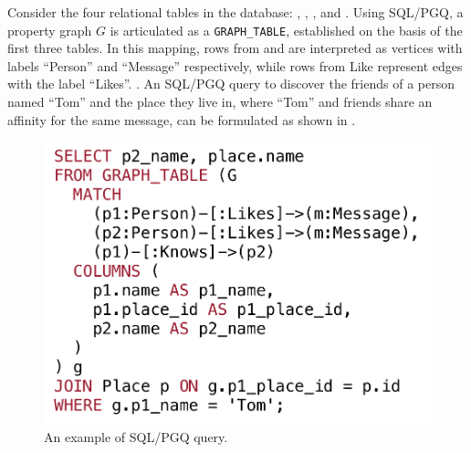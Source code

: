 \begin{example}
    \label{ex:introduction:sqlpgq}
    Consider the four relational tables in the database: , , , and . Using SQL/PGQ, a property graph $G$ is articulated as a \lstinline{GRAPH_TABLE}, established on the basis of the first three tables. In this mapping, rows from  and  are interpreted as vertices with labels ``Person'' and ``Message'' respectively, while rows from Like represent edges with the label ``Likes''. . An SQL/PGQ query to discover the friends of a person named ``Tom'' and the place they live in, where ``Tom'' and friends share an affinity for the same message, can be formulated as shown in .
    \begin{figure}
        \centering
        \includegraphics[width=.6\linewidth]{./figures/intro-query.pdf}
        \caption{An example of SQL/PGQ query.}
        \label{fig:intro-query}
    \end{figure}
\end{example}

